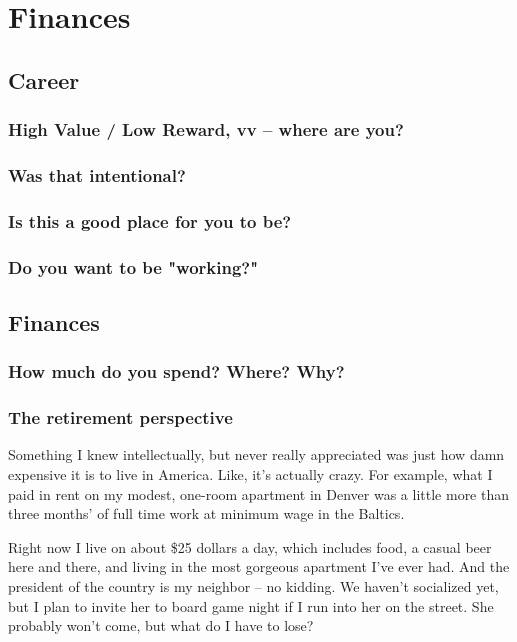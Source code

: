 \documentclass[../the-millions-of-gestures.tex]{subfiles}
\begin{document}
\chapter{Finances}
\TOWRITE
\section{Career}
\subsection{High Value / Low Reward, vv -- where are you?}
\subsection{Was that intentional?}
\subsection{Is this a good place for you to be?}
\subsection{Do you want to be "working?"}

\section{Finances}
\TOWRITE
\subsection{How much do you spend? Where? Why?}
\subsection{The retirement perspective}


Something I knew intellectually, but never really appreciated was just how damn
expensive it is to live in America. Like, it's actually crazy. For example, what
I paid in rent on my modest, one-room apartment in Denver was a little more than
three months' of full time work at minimum wage in the Baltics.

Right now I live on about \$25 dollars a day, which includes food, a casual beer
here and there, and living in the most gorgeous apartment I've ever had. And the
president of the country is my neighbor -- no kidding. We haven't socialized
yet, but I plan to invite her to board game night if I run into her on the
street. She probably won't come, but what do I have to lose?
\end{document}
